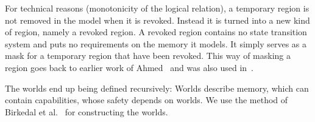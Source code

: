 \documentclass[compsoc,conference,letterpaper,fleqn]{IEEEtran}
\begin{document}
For technical reasons (monotonicity of the logical relation), a
temporary region is not removed in the model when it is
revoked. Instead it is turned into a new kind of region, namely a
revoked region. A revoked region contains no state transition
system and puts no requirements on the memory it models. It
simply serves as a mask for a temporary region that have been revoked.
This way of masking a region goes back to earlier work of
Ahmed~\cite{Ahmed2004semantics} and was also used in~\cite{Thamsborg:2011:KLR:2034773.2034831}.


The worlds end up being defined recursively: Worlds describe memory,
which can contain capabilities, whose safety depends on worlds. 
We use the method of Birkedal et
al.~\cite{Birkedal:2011:SKM:1926385.1926401} 
for constructing the worlds.
\end{document}
